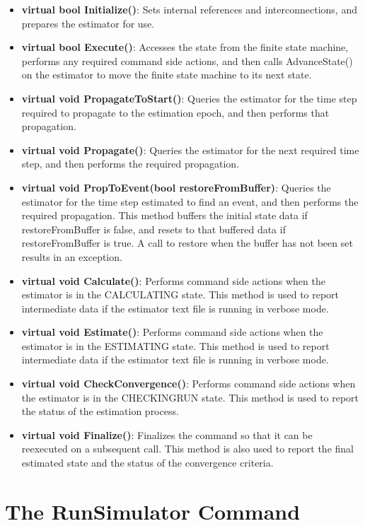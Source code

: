 \begin{itemize}
\item \textbf{virtual bool Initialize()}:  Sets internal references and interconnections, and prepares the estimator for use.
\item \textbf{virtual bool Execute()}:  Accesses the state from the finite state machine, performs any required command side actions, and then calls AdvanceState() on the estimator to move the finite state machine to its next state.
\item \textbf{virtual void PropagateToStart()}:  Queries the estimator for the time step required to propagate to the estimation epoch, and then performs that propagation.
\item \textbf{virtual void Propagate()}:  Queries the estimator for the next required time step, and then performs the required propagation.
\item \textbf{virtual void PropToEvent(bool restoreFromBuffer)}:  Queries the estimator for the time step estimated to find an event, and then performs the required propagation.  This method buffers the initial state data if restoreFromBuffer is false, and resets to that buffered data if restoreFromBuffer is true. A call to restore when the buffer has not been set results in an exception.
\item \textbf{virtual void Calculate()}:  Performs command side actions when the estimator is in the CALCULATING state.  This method is used to report intermediate data if the estimator text file is running in verbose mode.
\item \textbf{virtual void Estimate()}:  Performs command side actions when the estimator is in the ESTIMATING state.  This method is used to report intermediate data if the estimator text file is running in verbose mode.
\item \textbf{virtual void CheckConvergence()}:  Performs command side actions when the estimator is in the CHECKINGRUN state.  This method is used to report the status of the estimation process.
\item \textbf{virtual void Finalize()}:  Finalizes the command so that it can be reexecuted on a subsequent call. This method is also used to report the final estimated state and the status of the convergence criteria.
\end{itemize}

\section{The RunSimulator Command}

